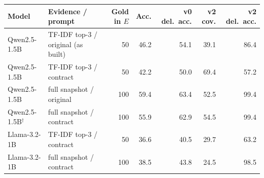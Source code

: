 \begin{tabular}{llrrrrr}
\toprule
Model & Evidence / prompt & Gold in $E$ & Acc. & v0 del.\ acc. & v2 cov. & v2 del.\ acc. \\
\midrule
Qwen2.5-1.5B & TF-IDF top-3 / original (as built) & 50 & 46.2 & 54.1 & 39.1 & 86.4 \\
Qwen2.5-1.5B & TF-IDF top-3 / contract & 50 & 42.2 & 50.0 & 69.4 & 57.2 \\
Qwen2.5-1.5B & full snapshot / original & 100 & 59.4 & 63.4 & 52.5 & 99.4 \\
Qwen2.5-1.5B$^\dagger$ & full snapshot / contract & 100 & 55.9 & 62.9 & 54.5 & 99.4 \\
Llama-3.2-1B & TF-IDF top-3 / contract & 50 & 36.6 & 40.5 & 29.7 & 63.2 \\
Llama-3.2-1B & full snapshot / contract & 100 & 38.5 & 43.8 & 24.5 & 98.5 \\
\bottomrule
\end{tabular}